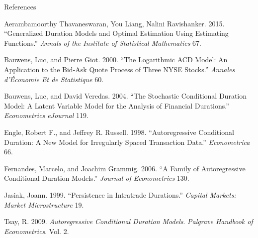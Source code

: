 \documentclass[
  ignorenonframetext,
]{beamer}
\newlength{\cslhangindent}
\newlength{\cslentryspacingunit} %
\newenvironment{CSLReferences}[2] %
 {%
  \setlength{\parindent}{0pt}
  \ifodd #1
  \let\oldpar\par
  \def\par{\hangindent=\cslhangindent\oldpar}
  \fi
  \setlength{\parskip}{#2\cslentryspacingunit}
 }%
 {}
\begin{document}
\begin{frame}[allowframebreaks]{References}
\protect\hypertarget{references}{}
\hypertarget{refs}{}
\begin{CSLReferences}{1}{0}
\leavevmode{}%
Aerambamoorthy Thavaneswaran, You Liang, Nalini Ravishanker. 2015.
{``Generalized Duration Models and Optimal Estimation Using Estimating
Functions.''} \emph{Annals of the Institute of Statistical Mathematics}
67.

\leavevmode{}%
Bauwens, Luc, and Pierre Giot. 2000. {``The Logarithmic ACD Model: An
Application to the Bid-Ask Quote Process of Three NYSE Stocks.''}
\emph{Annales d'Économie Et de Statistique} 60.

\leavevmode{}%
Bauwens, Luc, and David Veredas. 2004. {``The Stochastic Conditional
Duration Model: A Latent Variable Model for the Analysis of Financial
Durations.''} \emph{Econometrics eJournal} 119.

\leavevmode{}%
Engle, Robert F., and Jeffrey R. Russell. 1998. {``Autoregressive
Conditional Duration: A New Model for Irregularly Spaced Transaction
Data.''} \emph{Econometrica} 66.

\leavevmode{}%
Fernandes, Marcelo, and Joachim Grammig. 2006. {``A Family of
Autoregressive Conditional Duration Models.''} \emph{Journal of
Econometrics} 130.

\leavevmode{}%
Jasiak, Joann. 1999. {``Persistence in Intratrade Durations.''}
\emph{Capital Markets: Market Microstructure} 19.

\leavevmode{}%
Tsay, R. 2009. \emph{Autoregressive Conditional Duration Models}.
\emph{Palgrave Handbook of Econometrics}. Vol. 2.

\end{CSLReferences}
\end{frame}
\end{document}
